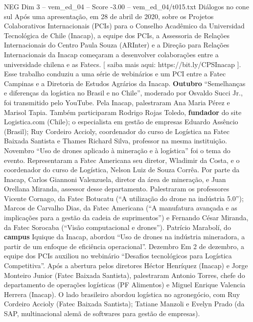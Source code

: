 \begin{textsample}{NEG Dim 3 – vem\_ed\_04 – Score -3.00 – vem\_ed\_04/t015.txt}  \label{ex:f3_neg_007}
Diálogos no cone sul Após uma apresentação, em 28 de abril de 2020, sobre os Projetos Colaborativos Internacionais (PCIs) para o Conselho Acadêmico da Universidad Tecnológica de Chile (Inacap), a equipe dos PCIs, a Assessoria de Relações Internacionais do Centro Paula Souza (ARInter) e a Direção para Relações Internacionais da Inacap começaram a desenvolver colaborações entre a universidade chilena e as Fatecs. [ saiba mais aqui: https://bit.ly/CPSInacap ].
Esse trabalho conduziu a uma série de webinários e um PCI entre a Fatec Campinas e a Diretoria de Estudos Agrários da Inacap. \textbf{Outubro} “Semelhanças e diferenças da logística no Brasil e no Chile”, moderado por Osvaldo Succi Jr., foi transmitido pelo YouTube.
Pela Inacap, palestraram Ana Maria Pérez e Marisol Tapia.
Também participaram Rodrigo Rojas Toledo, \textbf{fundador} do site Logistica.com (Chile); o especialista em gestão de empresas Eduardo Assêncio (Brasil); Ruy Cordeiro Accioly, coordenador do curso de Logística na Fatec Baixada Santista e Thames Richard Silva, professor na mesma instituição.
Novembro “Uso de drones aplicado à mineração e à logística” foi o tema do evento.
Representaram a Fatec Americana seu diretor, Wladimir da Costa, e o coordenador do curso de Logística, Nelson Luiz de Souza Corrêa.
Por parte da Inacap, Carlos Giannoni Valenzuela, diretor da área de mineração, e Juan Orellana Miranda, assessor desse departamento.
Palestraram os professores Vicente Cornago, da Fatec Botucatu (“A utilização do drone na indústria 5.0”); Marcos de Carvalho Dias, da Fatec Americana (“A manufatura avançada e as implicações para a gestão da cadeia de suprimentos”) e Fernando César Miranda, da Fatec Sorocaba (“Visão computacional e drones”).
Patrício Marabolí, do \textbf{campus} Iquique da Inacap, abordou “Uso de drones na indústria mineradora, a partir de um enfoque de eficiência operacional”.
Dezembro Em 2 de dezembro, a equipe dos PCIs auxiliou no webinário “Desafios tecnológicos para Logística Competitiva”.
Após a abertura pelos diretores Héctor Henríquez (Inacap) e Jorge Monteiro Junior (Fatec Baixada Santista), palestraram Antonio Torres, chefe do departamento de operações logísticas (PF Alimentos) e Miguel Enrique Valencia Herrera (Inacap).
O lado brasileiro abordou logística no agronegócio, com Ruy Cordeiro Accioly (Fatec Baixada Santista); Tatiane Manzoli e Evelyn Prado (da SAP, multinacional alemã de softwares para gestão de empresas).

\end{textsample}
